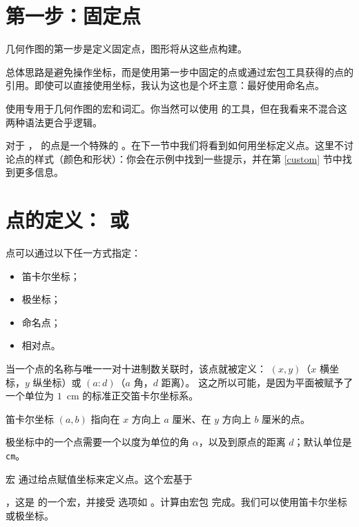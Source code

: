 \section{第一步：固定点}

几何作图的第一步是定义固定点，图形将从这些点构建。

总体思路是避免操作坐标，而是使用第一步中固定的点或通过宏包工具获得的点的引用。即使可以直接使用坐标，我认为这也是个坏主意：最好使用命名点。

\tkzname{\tkznameofpack} 使用专用于几何作图的宏和词汇。你当然可以使用 \TIKZ 的工具，但在我看来不混合这两种语法更合乎逻辑。

对于 \TIKZ，\tkzname{\tkznameofpack} 的点是一个特殊的 。在下一节中我们将看到如何用坐标定义点。这里不讨论点的样式（颜色和形状）：你会在示例中找到一些提示，并在第 \ref{custom} 节中找到更多信息。


\section{点的定义： 或 }

 点可以通过以下任一方式指定：
\begin{itemize}
\item 笛卡尔坐标；
\item 极坐标；
\item 命名点；
\item 相对点。
\end{itemize}


当一个点的名称与唯一一对十进制数关联时，该点就被定义：
 $(x,y)$（$x$ 横坐标，$y$ 纵坐标）或 $(a:d)$（$a$ 角，$d$ 距离）。
 这之所以可能，是因为平面被赋予了一个单位为 $1$~cm 的标准正交笛卡尔坐标系。

 笛卡尔坐标 $(a,b)$ 指向在 $x$ 方向上 $a$ 厘米、在 $y$ 方向上 $b$ 厘米的点。

 极坐标中的一个点需要一个以度为单位的角 $\alpha$，以及到原点的距离 $d$；默认单位是 \texttt{cm}。

 宏  通过给点赋值坐标来定义点。这个宏基于

 ，这是 \TIKZ 的一个宏，并接受 \TIKZ 选项如 。计算由宏包  完成。我们可以使用笛卡尔坐标或极坐标。

